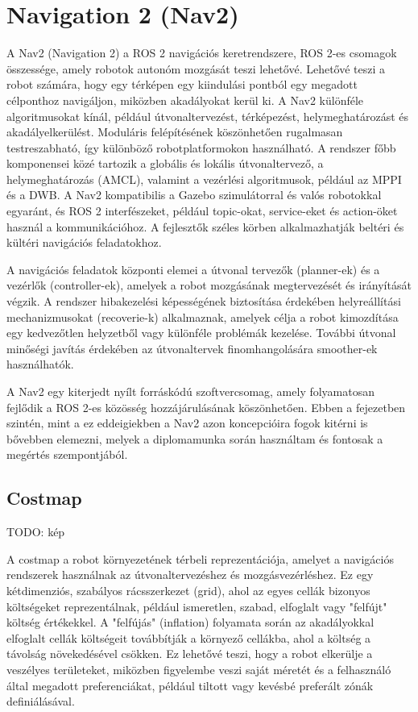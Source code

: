 \section{Navigation 2 (Nav2)}
A Nav2 (Navigation 2) a ROS 2 navigációs keretrendszere, ROS 2-es csomagok összessége, amely robotok autonóm mozgását teszi lehetővé. Lehetővé teszi a robot számára, hogy egy térképen egy kiindulási pontból egy megadott célponthoz navigáljon, miközben akadályokat kerül ki. A Nav2 különféle algoritmusokat kínál, például útvonaltervezést, térképezést, helymeghatározást és akadályelkerülést. Moduláris felépítésének köszönhetően rugalmasan testreszabható, így különböző robotplatformokon használható. A rendszer főbb komponensei közé tartozik a globális és lokális útvonaltervező, a helymeghatározás (AMCL), valamint a vezérlési algoritmusok, például az MPPI és a DWB. A Nav2 kompatibilis a Gazebo szimulátorral és valós robotokkal egyaránt, és ROS 2 interfészeket, például topic-okat, service-eket és action-öket használ a kommunikációhoz. A fejlesztők széles körben alkalmazhatják beltéri és kültéri navigációs feladatokhoz. \cite{nav2}

A navigációs feladatok központi elemei a útvonal tervezők (planner-ek) és a vezérlők (controller-ek), amelyek a robot mozgásának megtervezését és irányítását végzik. A rendszer hibakezelési képességének biztosítása érdekében helyreállítási mechanizmusokat (recoverie-k) alkalmaznak, amelyek célja a robot kimozdítása egy kedvezőtlen helyzetből vagy különféle problémák kezelése. További útvonal minőségi javítás érdekében az útvonaltervek finomhangolására smoother-ek használhatók. \cite{nav2}

A Nav2 egy kiterjedt nyílt forráskódú szoftvercsomag, amely folyamatosan fejlődik a ROS 2-es közösség hozzájárulásának köszönhetően. Ebben a fejezetben szintén, mint a ez eddeigiekben a Nav2 azon koncepcióira fogok kitérni is bővebben elemezni, melyek a diplomamunka során használtam és fontosak a megértés szempontjából.

\subsection{Costmap}
TODO: kép %

A costmap a robot környezetének térbeli reprezentációja, amelyet a navigációs rendszerek használnak az útvonaltervezéshez és mozgásvezérléshez. Ez egy kétdimenziós, szabályos rácsszerkezet (grid), ahol az egyes cellák bizonyos költségeket reprezentálnak, például ismeretlen, szabad, elfoglalt vagy "felfújt" költség értékekkel. A "felfújás" (inflation) folyamata során az akadályokkal elfoglalt cellák költségeit továbbítják a környező cellákba, ahol a költség a távolság növekedésével csökken. Ez lehetővé teszi, hogy a robot elkerülje a veszélyes területeket, miközben figyelembe veszi saját méretét és a felhasználó által megadott preferenciákat, például tiltott vagy kevésbé preferált zónák definiálásával. \cite{ros_wiki}

